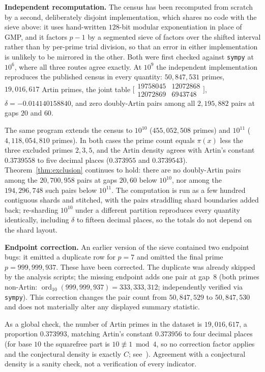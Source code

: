 \documentclass[11pt,reqno]{amsart}
\theoremstyle{plain}
\theoremstyle{definition}
\begin{document}
\textbf{Independent recomputation.} The census has been recomputed from
scratch by a second, deliberately disjoint implementation, which shares no
code with the sieve above: it uses hand-written $128$-bit modular
exponentiation in place of GMP, and it factors $p-1$ by a segmented sieve of
factors over the shifted interval rather than by per-prime trial division, so
that an error in either implementation is unlikely to be mirrored in the
other. Both were first checked against \texttt{sympy} at $10^6$, where all
three routes agree exactly. At $10^9$ the independent implementation
reproduces the published census in every quantity: $50{,}847{,}531$ primes,
$19{,}016{,}617$ Artin primes, the joint table
$\bigl[\begin{smallmatrix}19758045 & 12072868\\ 12072869 & 6943748\end{smallmatrix}\bigr]$,
$\delta = -0.014140158840$, and zero doubly-Artin pairs among all
$2{,}195{,}882$ pairs at gaps $20$ and $60$.

The same program extends the census to $10^{10}$ ($455{,}052{,}508$ primes)
and $10^{11}$ ($4{,}118{,}054{,}810$ primes). In both cases the prime count
equals $\pi(x)$ less the three excluded primes $2, 3, 5$, and the Artin
density agrees with Artin's constant $0.3739558$ to five decimal places
($0.373955$ and $0.3739543$). Theorem~\ref{thm:exclusion} continues to hold:
there are no doubly-Artin pairs among the $20{,}700{,}958$ pairs at gaps
$20, 60$ below $10^{10}$, nor among the $194{,}296{,}748$ such pairs below
$10^{11}$. The computation is run as a few hundred contiguous shards and
stitched, with the pairs straddling shard boundaries added back; re-sharding
$10^{10}$ under a different partition reproduces every quantity identically,
including $\delta$ to fifteen decimal places, so the totals do not depend on
the shard layout.

\textbf{Endpoint correction.} An earlier version of the sieve contained two
endpoint bugs: it emitted a duplicate row for $p = 7$ and omitted the final
prime $p = 999{,}999{,}937$. These have been corrected. The duplicate was
already skipped by the analysis scripts; the missing endpoint adds one pair
at gap~$8$ (both primes non-Artin: $\operatorname{ord}_{10}(999{,}999{,}937) =
	333{,}333{,}312$; independently verified via \texttt{sympy}). This correction
changes the pair count from $50{,}847{,}529$ to $50{,}847{,}530$ and does not
materially alter any displayed summary statistic.

As a global check, the number of Artin primes in the dataset is
$19{,}016{,}617$, a proportion $0.373993$, matching Artin's constant
$0.373956$ to four decimal places (for base $10$ the squarefree part is
$10 \not\equiv 1 \bmod 4$, so no correction factor applies and the conjectural
density is exactly $C$; see~\cite{Hooley1967,Moree2012}). Agreement with a
conjectural density is a sanity check, not a verification of every indicator.
\end{document}
